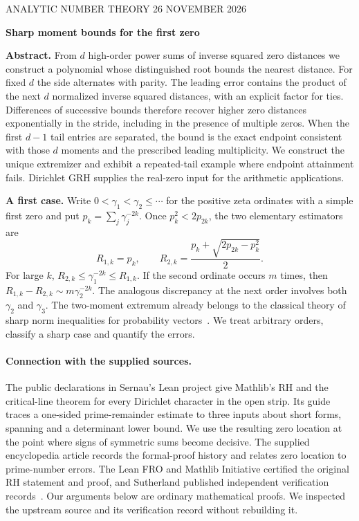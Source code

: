 \documentclass[11pt]{article}
\begin{document}
\thispagestyle{plain}
{\small\sffamily\color{ink} ANALYTIC NUMBER THEORY \hfill 26 NOVEMBER 2026}\par\vspace{12pt}
{\huge\bfseries\color{ink}Sharp moment bounds for the first zero\par}
\vspace{13pt}
\noindent\textbf{Abstract.}
From $d$ high-order power sums of inverse squared zero distances we construct a
polynomial whose distinguished root bounds the nearest distance. For fixed
$d$ the side alternates with parity. The leading error contains the product
of the next $d$ normalized inverse squared distances, with an explicit
factor for ties. Differences of successive bounds therefore recover higher
zero distances exponentially in the stride, including in the presence of
multiple zeros. When the first $d-1$ tail entries are separated, the bound
is the exact endpoint consistent with those $d$ moments and the prescribed
leading multiplicity. We construct the unique extremizer and exhibit a
repeated-tail example where endpoint attainment fails. Dirichlet GRH supplies
the real-zero input for the arithmetic applications.
\medskip

\noindent\textbf{A first case.}
Write $0<\gamma_1<\gamma_2\le\cdots$ for the positive zeta ordinates
with a simple first zero and put $p_k=\sum_j\gamma_j^{-2k}$. Once
$p_k^2<2p_{2k}$, the two elementary estimators are
\[
      R_{1,k}=p_k,\qquad
      R_{2,k}=\frac{p_k+\sqrt{2p_{2k}-p_k^2}}{2}.
\]
For large $k$, $R_{2,k}\le\gamma_1^{-2k}\le R_{1,k}$. If the second
ordinate occurs $m$ times, then
$R_{1,k}-R_{2,k}\sim m\gamma_2^{-2k}$. The analogous discrepancy at
the next order involves both $\gamma_2$ and $\gamma_3$. The two-moment
extremum already belongs to the classical theory of sharp norm inequalities
for probability vectors~\cite{sakai}. We treat arbitrary orders, classify a
sharp case and quantify the errors.

\paragraph{Connection with the supplied sources.}
The public declarations in Sernau's Lean project give Mathlib's RH and the
critical-line theorem for every Dirichlet character in the open strip.
Its guide traces a one-sided prime-remainder estimate to three inputs about
short forms, spanning and a determinant lower bound. We use the resulting
zero location at the point where signs of symmetric sums become decisive.
The supplied encyclopedia article records the formal-proof history and
relates zero location to prime-number errors. The Lean FRO and Mathlib
Initiative certified the original RH statement and proof, and Sutherland
published independent verification records~\cite{lean,verification,wiki}.
Our arguments below are ordinary mathematical proofs. We inspected the
upstream source and its verification record without rebuilding it.
\end{document}
